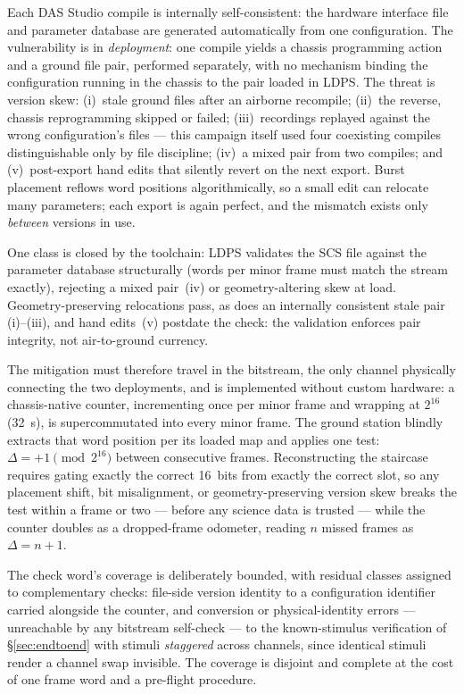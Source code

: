 \documentclass[12pt,letterpaper]{article}
\begin{document}
Each DAS Studio compile is internally self-consistent: the hardware
interface file and parameter database are generated automatically from
one configuration. The vulnerability is in \emph{deployment}: one
compile yields a chassis programming action and a ground file pair,
performed separately, with no mechanism binding the configuration running
in the chassis to the pair loaded in LDPS. The threat is version skew:
(i)~stale ground files after an airborne recompile; (ii)~the reverse,
chassis reprogramming skipped or failed; (iii)~recordings replayed
against the wrong configuration's files --- this campaign itself used
four coexisting compiles distinguishable only by file discipline;
(iv)~a mixed pair from two compiles; and (v)~post-export hand edits that
silently revert on the next export. Burst placement reflows word
positions algorithmically, so a small edit can relocate many parameters;
each export is again perfect, and the mismatch exists only
\emph{between} versions in use.

One class is closed by the toolchain: LDPS validates the SCS file
against the parameter database structurally (words per minor frame must
match the stream exactly), rejecting a mixed pair~(iv) or
geometry-altering skew at load. Geometry-preserving relocations pass, as
does an internally consistent stale pair (i)--(iii), and hand edits~(v)
postdate the check: the validation enforces pair integrity, not
air-to-ground currency.

The mitigation must therefore travel in the bitstream, the only channel
physically connecting the two deployments, and is implemented without
custom hardware: a chassis-native counter, incrementing once per minor
frame and wrapping at $2^{16}$ (32~s), is supercommutated into every
minor frame. The ground station blindly extracts that word position per
its loaded map and applies one test: $\Delta = +1 \pmod{2^{16}}$
between consecutive frames. Reconstructing the staircase requires gating
exactly the correct 16~bits from exactly the correct slot, so any
placement shift, bit misalignment, or geometry-preserving version skew
breaks the test within a frame or two --- before any science data is
trusted --- while the counter doubles as a dropped-frame odometer,
reading $n$ missed frames as $\Delta = n{+}1$.

The check word's coverage is deliberately bounded, with residual classes
assigned to complementary checks: file-side version identity to a
configuration identifier carried alongside the counter, and conversion or
physical-identity errors --- unreachable by any bitstream self-check ---
to the known-stimulus verification of \S\ref{sec:endtoend} with stimuli
\emph{staggered} across channels, since identical stimuli render a
channel swap invisible. The coverage is disjoint and complete at the cost
of one frame word and a pre-flight procedure.
\end{document}
